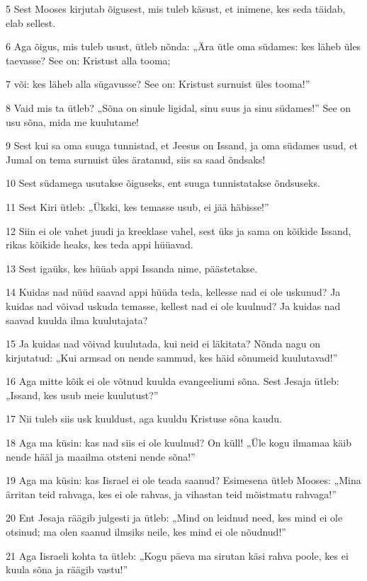 \par 5 Sest Mooses kirjutab õigusest, mis tuleb käsust, et inimene, kes seda täidab, elab sellest.
\par 6 Aga õigus, mis tuleb usust, ütleb nõnda: „Ära ütle oma südames: kes läheb üles taevasse? See on: Kristust alla tooma;
\par 7 või: kes läheb alla sügavusse? See on: Kristust surnuist üles tooma!”
\par 8 Vaid mis ta ütleb? „Sõna on sinule ligidal, sinu suus ja sinu südames!” See on usu sõna, mida me kuulutame!
\par 9 Sest kui sa oma suuga tunnistad, et Jeesus on Issand, ja oma südames usud, et Jumal on tema surnuist üles äratanud, siis sa saad õndsaks!
\par 10 Sest südamega usutakse õiguseks, ent suuga tunnistatakse õndsuseks.
\par 11 Sest Kiri ütleb: „Ükski, kes temasse usub, ei jää häbisse!”
\par 12 Siin ei ole vahet juudi ja kreeklase vahel, sest üks ja sama on kõikide Issand, rikas kõikide heaks, kes teda appi hüüavad.
\par 13 Sest igaüks, kes hüüab appi Issanda nime, päästetakse.
\par 14 Kuidas nad nüüd saavad appi hüüda teda, kellesse nad ei ole uskunud? Ja kuidas nad võivad uskuda temasse, kellest nad ei ole kuulnud? Ja kuidas nad saavad kuulda ilma kuulutajata?
\par 15 Ja kuidas nad võivad kuulutada, kui neid ei läkitata? Nõnda nagu on kirjutatud: „Kui armsad on nende sammud, kes häid sõnumeid kuulutavad!”
\par 16 Aga mitte kõik ei ole võtnud kuulda evangeeliumi sõna. Sest Jesaja ütleb: „Issand, kes usub meie kuulutust?”
\par 17 Nii tuleb siis usk kuuldust, aga kuuldu Kristuse sõna kaudu.
\par 18 Aga ma küsin: kas nad siis ei ole kuulnud? On küll! „Üle kogu ilmamaa käib nende hääl ja maailma otsteni nende sõna!”
\par 19 Aga ma küsin: kas Iisrael ei ole teada saanud? Esimesena ütleb Mooses: „Mina ärritan teid rahvaga, kes ei ole rahvas, ja vihastan teid mõistmatu rahvaga!”
\par 20 Ent Jesaja räägib julgesti ja ütleb: „Mind on leidnud need, kes mind ei ole otsinud; ma olen saanud ilmsiks neile, kes mind ei ole nõudnud!”
\par 21 Aga Iisraeli kohta ta ütleb: „Kogu päeva ma sirutan käsi rahva poole, kes ei kuula sõna ja räägib vastu!”


